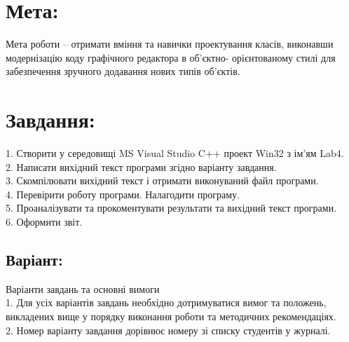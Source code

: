 \documentclass[14pt]{article}
\begin{document}

    \tableofcontents
    \newpage


    \section{Мета:}
    Мета роботи – отримати вміння та навички проектування класів, виконавши модернізацію коду графічного редактора в об’єктно- орієнтованому стилі для забезпечення зручного додавання нових типів об'єктів.


    \section{Завдання:}
    1. Створити у середовищі MS Visual Studio C++ проект Win32 з ім’ям Lab4.\\
    2. Написати вихідний текст програми згідно варіанту завдання.\\
    3. Скомпілювати вихідний текст і отримати виконуваний файл програми.\\
    4. Перевірити роботу програми. Налагодити програму.\\
    5. Проаналізувати та прокоментувати результати та вихідний текст програми.\\
    6. Оформити звіт.\\

    \subsection{Варіант: }
    Варіанти завдань та основні вимоги\\
    1. Для усіх варіантів завдань необхідно дотримуватися вимог та положень, викладених вище у порядку виконання роботи та методичних рекомендаціях.\\
    2. Номер варіанту завдання дорівнює номеру зі списку студентів у журналі.\\
\end{document}
